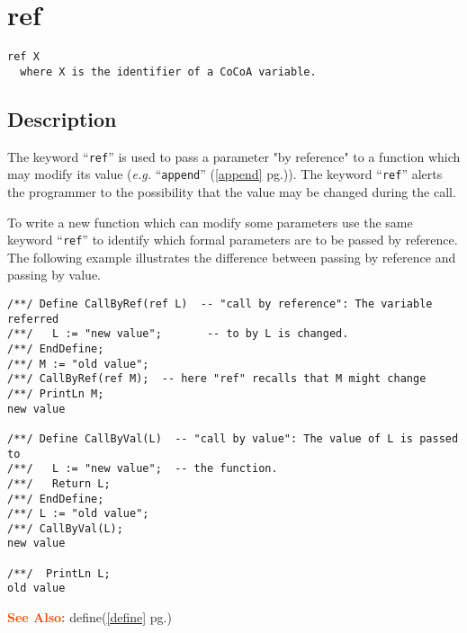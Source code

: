 \documentclass[a4paper]{mybook}
\newenvironment{command}{}{} %
\newcommand\SeeAlso{\par\textcolor{OrangeRed}{\textbf{\large See Also: }}}
\begin{document}
\section{ref}
\label{ref}
\begin{command} %


\begin{Verbatim}[label=syntax, rulecolor=\color{MidnightBlue},
frame=single]
ref X
  where X is the identifier of a CoCoA variable.
\end{Verbatim}


\subsection*{Description}

The keyword ``\verb&ref&'' is used to pass a parameter "by reference" to a
function which may modify its value (\textit{e.g.} ``\verb&append&'' (\ref{append} pg.\pageref{append})).
The keyword ``\verb&ref&'' alerts the programmer to the possibility that the
value may be changed during the call.
\par 
To write a new function which can modify some parameters use the same
keyword ``\verb&ref&'' to identify which formal parameters are to be passed
by reference.  The following example illustrates the difference between
passing by reference and passing by value.
\begin{Verbatim}[label=example, rulecolor=\color{PineGreen}, frame=single]
/**/ Define CallByRef(ref L)  -- "call by reference": The variable referred
/**/   L := "new value";       -- to by L is changed.
/**/ EndDefine;
/**/ M := "old value";
/**/ CallByRef(ref M);  -- here "ref" recalls that M might change
/**/ PrintLn M;
new value

/**/ Define CallByVal(L)  -- "call by value": The value of L is passed to
/**/   L := "new value";  -- the function.
/**/   Return L;
/**/ EndDefine;
/**/ L := "old value";
/**/ CallByVal(L);
new value

/**/  PrintLn L;
old value
\end{Verbatim}


\SeeAlso %
  define(\ref{define} pg.\pageref{define})
\end{command} %
\end{document}
